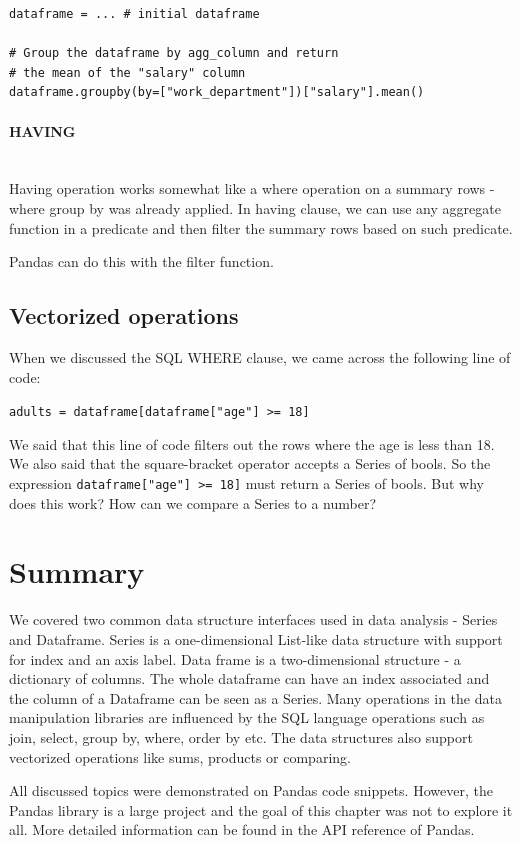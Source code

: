 \begin{lstlisting}[caption=Group by in Pandas, label={lst:pandas_groupby}, captionpos=b]
dataframe = ... # initial dataframe

# Group the dataframe by agg_column and return
# the mean of the "salary" column
dataframe.groupby(by=["work_department"])["salary"].mean()
\end{lstlisting}

\paragraph{HAVING} \leavevmode \\

Having operation works somewhat like a where operation on a summary rows - where group by was already applied.
In having clause, we can use any aggregate function in a predicate and then filter the summary rows based on such
predicate.

Pandas can do this with the filter function. 



\subsection{Vectorized operations}

When we discussed the SQL WHERE clause, we came across the following line of code:

\verb|adults = dataframe[dataframe["age"] >= 18]|

We said that this line of code filters out the rows where the age is less than 18.
We also said that the square-bracket operator accepts a Series of bools.
So the expression \verb|dataframe["age"] >= 18]| must return a Series of bools.
But why does this work?
How can we compare a Series to a number?


\section*{Summary} %

We covered two common data structure interfaces used in data analysis - Series and Dataframe.
Series is a one-dimensional List-like data structure with support for index and an axis label.
Data frame is a two-dimensional structure - a dictionary of columns.
The whole dataframe can have an index associated and the column of a Dataframe can be seen as a Series.
Many operations in the data manipulation libraries are influenced by the SQL language operations such as join, select,
group by, where, order by etc.
The data structures also support vectorized operations like sums, products or comparing.

All discussed topics were demonstrated on Pandas code snippets.
However, the Pandas library is a large project and the goal of this chapter was not to explore it all.
More detailed information can be found in the API reference of Pandas\cite{pandas_docs}.